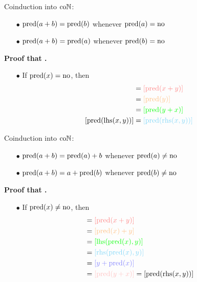 \begin{frame}[t]{Coinduction into $\mathrm{co}\mathbb{N}$: \currentGoal} %
  \simpleCoindNBlock

  \begin{itemize}
    \item[$\bullet$] {
      $\operatorname{pred}(a + b) = \operatorname{pred}(b)$ whenever $\operatorname{pred}(a) = \mathrm{no}$
    }
    \item[$\bullet$] {
      $\operatorname{pred}(a + b) = \operatorname{pred}(a)$ whenever $\operatorname{pred}(b) = \mathrm{no}$
    }
  \end{itemize}

  \vspace{0.5 \baselineskip}

  \par\textbf{Proof that \currentGoal.}
  \begin{itemize}
    \item[$\bullet$] {
      If $\operatorname{pred}(x) = \mathrm{no}$, then
      \pause
      \begin{align*}
        [\pred(\lhs(x, y))]
        &= \red{[\pred(x + y)]}
        \\
        &= \orange{[\pred(y)]}
        \\
        &= \green{[\pred(y + x)]}
        \\
        [\pred(\lhs(x, y))]
        &= \cyan{[\pred(\rhs(x, y))]}
      \end{align*}
    }
  \end{itemize}
  
\end{frame}

\begin{frame}[t]{Coinduction into $\mathrm{co}\mathbb{N}$: \currentGoal} %
  \simpleCoindNBlock

  \begin{itemize}
    \item[$\bullet$] {
      $\operatorname{pred}(a + b) = \operatorname{pred}(a) + b$ whenever $\operatorname{pred}(a) \neq \mathrm{no}$
    }
    \item[$\bullet$] {
      $\operatorname{pred}(a + b) = a + \operatorname{pred}(b)$ whenever $\operatorname{pred}(b) \neq \mathrm{no}$
    }
  \end{itemize}

  \vspace{0.5 \baselineskip}

  \par\textbf{Proof that \currentGoal.}
  \begin{itemize}
    \item[$\bullet$] {
      If $\operatorname{pred}(x) \neq \mathrm{no}$, then
      \pause
      \begin{align*}
        [\pred(\lhs(x, y))]
        &= \red{[\pred(x + y)]}
        \\
        &= \orange{[\pred(x) + y]}
        \\
        &= \green{[\lhs(\pred(x), y)]}
        \\
        &= \cyan{[\rhs(\pred(x), y)]}
        \\
        &= \blue{[y + \pred(x)]}
        \\
        &= \pink{[\pred(y + x)]}
        = [\pred(\rhs(x, y))]
      \end{align*}
    }
  \end{itemize}
  
\end{frame}

